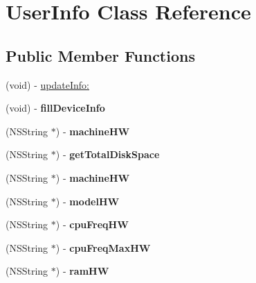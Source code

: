 \hypertarget{interface_user_info}{
\section{UserInfo Class Reference}
\label{interface_user_info}
}
\subsection*{Public Member Functions}
\begin{DoxyCompactItemize}
\item 
(void) -\/ \hyperlink{interface_user_info_ac693b7552d3b492e6e5d56a6a5f1ff66}{updateInfo:}
\item 
\hypertarget{interface_user_info_a2b55ad653d368f4a0882f99d9944b2cb}{
(void) -\/ {\bfseries fillDeviceInfo}}
\label{interface_user_info_a2b55ad653d368f4a0882f99d9944b2cb}

\item 
\hypertarget{interface_user_info_aa983147392c37b39c6e8f730f3003e00}{
(NSString $\ast$) -\/ {\bfseries machineHW}}
\label{interface_user_info_aa983147392c37b39c6e8f730f3003e00}

\item 
\hypertarget{interface_user_info_a63a25d7561099ae2d43919d1a6dc27ac}{
(NSString $\ast$) -\/ {\bfseries getTotalDiskSpace}}
\label{interface_user_info_a63a25d7561099ae2d43919d1a6dc27ac}

\item 
\hypertarget{interface_user_info_a6b4edd16ac9d62fe693ecb5c460017ce}{
(NSString $\ast$) -\/ {\bfseries machineHW}}
\label{interface_user_info_a6b4edd16ac9d62fe693ecb5c460017ce}

\item 
\hypertarget{interface_user_info_a9d0400c26b05db005ee7daff3c2f3f2f}{
(NSString $\ast$) -\/ {\bfseries modelHW}}
\label{interface_user_info_a9d0400c26b05db005ee7daff3c2f3f2f}

\item 
\hypertarget{interface_user_info_a1a74784950d6151da4f78f8609f92d4e}{
(NSString $\ast$) -\/ {\bfseries cpuFreqHW}}
\label{interface_user_info_a1a74784950d6151da4f78f8609f92d4e}

\item 
\hypertarget{interface_user_info_ac1a7570173f79a66e4af61d885e6f9da}{
(NSString $\ast$) -\/ {\bfseries cpuFreqMaxHW}}
\label{interface_user_info_ac1a7570173f79a66e4af61d885e6f9da}

\item 
\hypertarget{interface_user_info_af32582599e0403b4100a19b67d2c53ff}{
(NSString $\ast$) -\/ {\bfseries ramHW}}
\label{interface_user_info_af32582599e0403b4100a19b67d2c53ff}


\end{DoxyCompactItemize}

